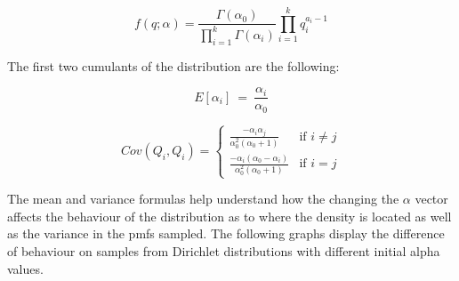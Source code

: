 \documentclass[twoside,hidelinks]{article}
\begin{document}
$$ f(q; \alpha) = \frac{ \Gamma( \alpha_0)  }{ \prod_{i=1}^{k} \Gamma ( \alpha_i) } \prod_{i=1}^{k} q_i^{a_i -1}$$

The first two cumulants of the distribution are the following:

$$ E[ \alpha_i]\ =\ \frac{ \alpha_i }{ \alpha_0 } $$

\[
 Cov(Q_i,Q_i) =
\left\{
	\begin{array}{ll}
		\frac{ - \alpha_i \alpha_j }{ \alpha_0^2 ( \alpha_0+1) }                   & \mbox{if } i \neq j  \\
		\frac{ - \alpha_i ( \alpha_0 - \alpha_i) }{ \alpha_0^2 ( \alpha_0+1)} & \mbox{if } i=j
	\end{array}
\right.
\]

The mean and variance formulas help understand how the changing the $ \alpha $ vector affects the behaviour of the distribution as to where the density is located as well as the variance in the pmfs sampled. The following graphs display the difference of behaviour on samples from Dirichlet distributions with different initial alpha values.
\end{document}
